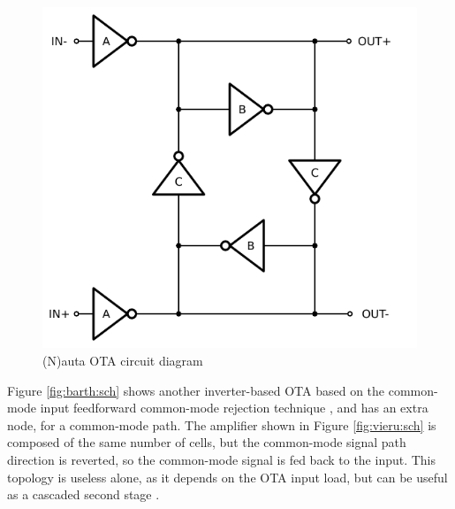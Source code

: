 \documentclass[conference]{IEEEtran}
\begin{document}
	
	\begin{figure}[!htbp]
		\centerline{\includegraphics[scale=0.50]{circuits/nauta.pdf}}
		\caption{(N)auta OTA circuit diagram \cite{nauta1992cmos}}
		\label{fig:nauta:sch}
	\end{figure}
	
	Figure \ref{fig:barth:sch} shows another inverter-based OTA based on the common-mode input feedforward common-mode rejection technique \cite{barthelemy2008ota}, and has an extra node, for a common-mode path. The amplifier shown in Figure \ref{fig:vieru:sch} is composed of the same number of cells, but the common-mode signal path direction is reverted, so the common-mode signal is fed back to the input. This topology is useless alone, as it depends on the OTA input load, but can be useful as a cascaded second stage \cite{vieru2011inverter}.
	
\end{document}
